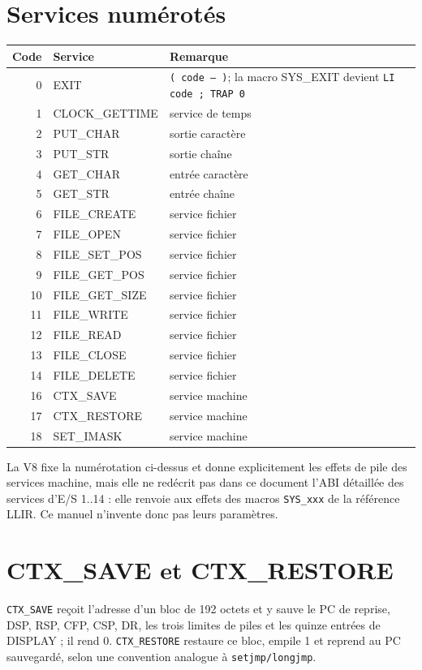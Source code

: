 \documentclass[10pt,a4paper,twoside,openany]{book}
\newcommand{\stack}[1]{\texttt{#1}}
\begin{document}
\section{Services numérotés}
\begin{center}
\begin{tabularx}{\linewidth}{@{}r l X@{}}
\toprule Code & Service & Remarque\\ \midrule
0 & EXIT & \stack{( code -- )}; la macro SYS\_EXIT devient \texttt{LI code ; TRAP 0}\\
1 & CLOCK\_GETTIME & service de temps\\
2 & PUT\_CHAR & sortie caractère\\
3 & PUT\_STR & sortie chaîne\\
4 & GET\_CHAR & entrée caractère\\
5 & GET\_STR & entrée chaîne\\
6 & FILE\_CREATE & service fichier\\
7 & FILE\_OPEN & service fichier\\
8 & FILE\_SET\_POS & service fichier\\
9 & FILE\_GET\_POS & service fichier\\
10 & FILE\_GET\_SIZE & service fichier\\
11 & FILE\_WRITE & service fichier\\
12 & FILE\_READ & service fichier\\
13 & FILE\_CLOSE & service fichier\\
14 & FILE\_DELETE & service fichier\\
16 & CTX\_SAVE & service machine\\
17 & CTX\_RESTORE & service machine\\
18 & SET\_IMASK & service machine\\
\bottomrule
\end{tabularx}
\end{center}
\begin{designbox}[Périmètre de la V8]
La V8 fixe la numérotation ci-dessus et donne explicitement les effets de pile des services machine, mais elle ne redécrit pas dans ce document l'ABI détaillée des services d'E/S 1..14 : elle renvoie aux effets des macros \texttt{SYS\_xxx} de la référence LLIR. Ce manuel n'invente donc pas leurs paramètres.
\end{designbox}

\section{CTX\_SAVE et CTX\_RESTORE}
\texttt{CTX\_SAVE} reçoit l'adresse d'un bloc de 192 octets et y sauve le PC de reprise, DSP, RSP, CFP, CSP, DR, les trois limites de piles et les quinze entrées de DISPLAY ; il rend 0. \texttt{CTX\_RESTORE} restaure ce bloc, empile 1 et reprend au PC sauvegardé, selon une convention analogue à \texttt{setjmp/longjmp}.
\end{document}
